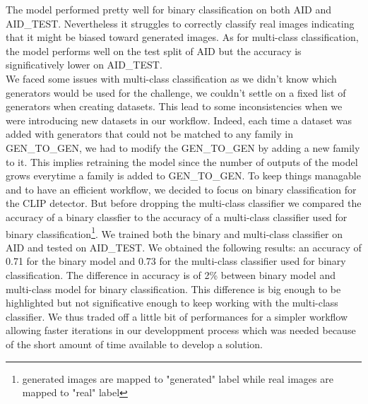 \documentclass[12pt,a4paper]{article}
\begin{document}
The model performed pretty well for binary classification on both AID and AID\_TEST. Nevertheless it struggles to correctly classify real images indicating that it might be biased toward generated images. As for multi-class classification, the model performs well on the test split of AID but the accuracy is significatively lower on AID\_TEST.\\


We faced some issues with multi-class classification as we didn't know which generators would be used for the challenge, we couldn't settle on a fixed list of generators when creating datasets. This lead to some inconsistencies when we were introducing new datasets in our workflow. Indeed, each time a dataset was added with generators that could not be matched to any family in GEN\_TO\_GEN, we had to modify the GEN\_TO\_GEN by adding a new family to it. This implies retraining the model since the number of outputs of the model grows everytime a family is added to GEN\_TO\_GEN. To keep things managable and to have an efficient workflow, we decided to focus on binary classification for the CLIP detector. But before dropping the multi-class classifier we compared the accuracy of a binary classfier to the accuracy of a multi-class classifier used for binary classification\footnote{generated images are mapped to "generated" label while real images are mapped to "real" label}. We trained both the binary and multi-class classifier on AID and tested on AID\_TEST. We obtained the following results: an accuracy of 0.71 for the binary model and 0.73 for the multi-class classifier used for binary classification. The difference in accuracy is of 2\% between binary model and multi-class model for binary classification. This difference is big enough to be highlighted but not significative enough to keep working with the multi-class classifier. We thus traded off a little bit of performances for a simpler workflow allowing faster iterations in our developpment process which was needed because of the short amount of time available to develop a solution.\\
\end{document}
